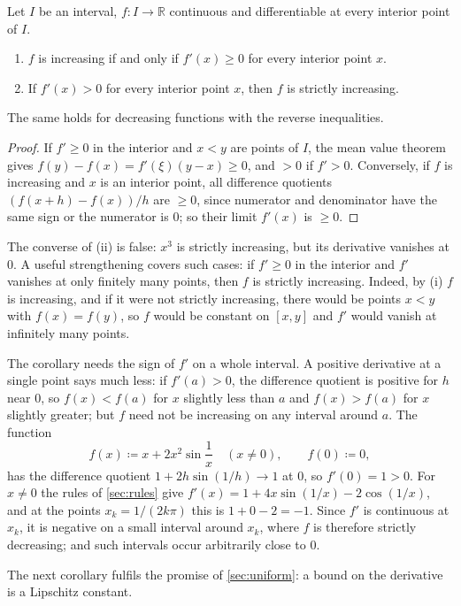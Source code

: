 \begin{corollary}[Monotonicity]
\label{cor:monotone-derivative}
Let $I$ be an interval, $f\colon I\to\mathbb R$ continuous and differentiable at every interior point of $I$.
\begin{enumerate}
\item $f$ is increasing if and only if $f'(x)\ge0$ for every interior point $x$.
\item If $f'(x)>0$ for every interior point $x$, then $f$ is strictly increasing.
\end{enumerate}
The same holds for decreasing functions with the reverse inequalities.
\end{corollary}

\begin{proof}
If $f'\ge0$ in the interior and $x<y$ are points of $I$, the mean value theorem gives $f(y)-f(x)=f'(\xi)(y-x)\ge0$, and $>0$ if $f'>0$. Conversely, if $f$ is increasing and $x$ is an interior point, all difference quotients $(f(x+h)-f(x))/h$ are $\ge0$, since numerator and denominator have the same sign or the numerator is $0$; so their limit $f'(x)$ is $\ge0$.
\end{proof}

The converse of (ii) is false: $x^3$ is strictly increasing, but its derivative vanishes at $0$. A useful strengthening covers such cases: if $f'\ge0$ in the interior and $f'$ vanishes at only finitely many points, then $f$ is strictly increasing. Indeed, by (i) $f$ is increasing, and if it were not strictly increasing, there would be points $x<y$ with $f(x)=f(y)$, so $f$ would be constant on $[x,y]$ and $f'$ would vanish at infinitely many points.

The corollary needs the sign of $f'$ on a whole interval. A positive derivative at a single point says much less: if $f'(a)>0$, the difference quotient is positive for $h$ near $0$, so $f(x)<f(a)$ for $x$ slightly less than $a$ and $f(x)>f(a)$ for $x$ slightly greater; but $f$ need not be increasing on any interval around $a$. The function
\[
f(x)\coloneqq x+2x^2\sin\frac1x\quad(x\ne0),\qquad f(0)\coloneqq0,
\]
has the difference quotient $1+2h\sin(1/h)\to1$ at $0$, so $f'(0)=1>0$. For $x\ne0$ the rules of \cref{sec:rules} give $f'(x)=1+4x\sin(1/x)-2\cos(1/x)$, and at the points $x_k=1/(2k\pi)$ this is $1+0-2=-1$. Since $f'$ is continuous at $x_k$, it is negative on a small interval around $x_k$, where $f$ is therefore strictly decreasing; and such intervals occur arbitrarily close to $0$.

The next corollary fulfils the promise of \cref{sec:uniform}: a bound on the derivative is a Lipschitz constant.

